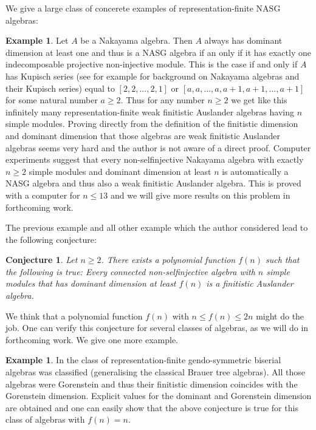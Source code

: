 \documentclass[a4paper]{amsart}
\newtheorem*{conjecture}{Conjecture}
\theoremstyle{definition}
\newtheorem{example}[theorem]{Example}
\theoremstyle{remark}
\numberwithin{equation}{theorem}
\begin{document}
We give a large class of concerete examples of representation-finite NASG algebras:
\begin{example}
Let $A$ be a Nakayama algebra. Then $A$ always has dominant dimension at least one and thus is a NASG algebra if an only if it has exactly one indecomposable projective non-injective module. This is the case if and only if $A$ has Kupisch series (see for example \cite{Mar2} for background on Nakayama algebras and their Kupisch series) equal to $[2,2,...,2,1]$ or $[a,a,...,a,a+1,a+1,...,a+1]$ for some natural number $a \geq 2$. Thus for any number $n \geq 2$ we get like this infinitely many representation-finite weak finitistic Auslander algebras having $n$ simple modules.
Proving directly from the definition of the finitistic dimension and dominant dimension that those algebras are weak finitistic Auslander algebras seems very hard and the author is not aware of a direct proof.
Computer experiments suggest that every non-selfinjective Nakayama algebra with exactly $n \geq 2$ simple modules and dominant dimension at least $n$ is automatically a NASG algebra and thus also a weak finitistic Auslander algebra.
This is proved with a computer for $n \leq 13$ and we will give more results on this problem in forthcoming work.

\end{example}


The previous example and all other example which the author considered lead to the following conjecture:
\begin{conjecture}
Let $n \geq 2$.
There exists a polynomial function $f(n)$ such that the following is true: \newline
Every connected non-selfinjective algebra with $n$ simple modules that has dominant dimension at least $f(n)$ is a finitistic Auslander algebra.
\end{conjecture}
We think that a polynomial function $f(n)$ with $n \leq f(n) \leq 2n$ might do the job. One can verify this conjecture for several classes of algebras, as we will do in forthcoming work. We give one more example.
\begin{example}
In \cite{ChMar} the class of representation-finite gendo-symmetric biserial algebras was classified (generalising the classical Brauer tree algebras). All those algebras were Gorenstein and thus their finitistic dimension coincides with the Gorenstein dimension. Explicit values for the dominant and Gorenstein dimension are obtained and one can easily show that the above conjecture is true for this class of algebras with $f(n)=n$.
\end{example}
\end{document}
